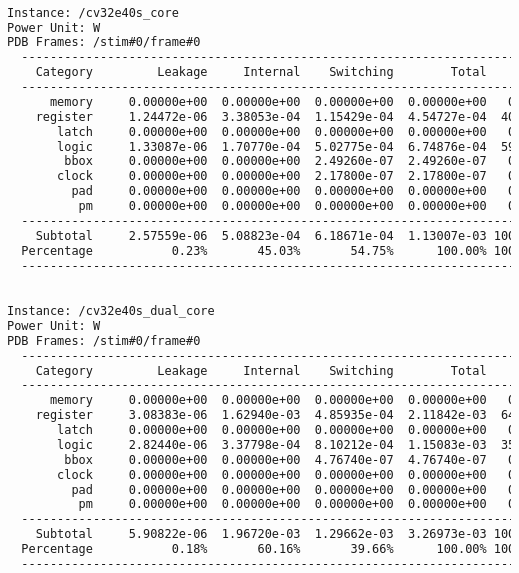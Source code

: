 \begin{lstlisting}[caption={Power usage report from synthesis of the CV32E40S.}, label=lst:cv32e40s_power, language=txt]

Instance: /cv32e40s_core
Power Unit: W
PDB Frames: /stim#0/frame#0
  -------------------------------------------------------------------------
    Category         Leakage     Internal    Switching        Total    Row%
  -------------------------------------------------------------------------
      memory     0.00000e+00  0.00000e+00  0.00000e+00  0.00000e+00   0.00%
    register     1.24472e-06  3.38053e-04  1.15429e-04  4.54727e-04  40.24%
       latch     0.00000e+00  0.00000e+00  0.00000e+00  0.00000e+00   0.00%
       logic     1.33087e-06  1.70770e-04  5.02775e-04  6.74876e-04  59.72%
        bbox     0.00000e+00  0.00000e+00  2.49260e-07  2.49260e-07   0.02%
       clock     0.00000e+00  0.00000e+00  2.17800e-07  2.17800e-07   0.02%
         pad     0.00000e+00  0.00000e+00  0.00000e+00  0.00000e+00   0.00%
          pm     0.00000e+00  0.00000e+00  0.00000e+00  0.00000e+00   0.00%
  -------------------------------------------------------------------------
    Subtotal     2.57559e-06  5.08823e-04  6.18671e-04  1.13007e-03 100.00%
  Percentage           0.23%       45.03%       54.75%      100.00% 100.00%
  -------------------------------------------------------------------------
\end{lstlisting}

\begin{lstlisting}[caption={Power usage report from synthesis of the CV32E40SDC.}, label=lst:cv32e40dc_power, language=txt]

Instance: /cv32e40s_dual_core
Power Unit: W
PDB Frames: /stim#0/frame#0
  -------------------------------------------------------------------------
    Category         Leakage     Internal    Switching        Total    Row%
  -------------------------------------------------------------------------
      memory     0.00000e+00  0.00000e+00  0.00000e+00  0.00000e+00   0.00%
    register     3.08383e-06  1.62940e-03  4.85935e-04  2.11842e-03  64.79%
       latch     0.00000e+00  0.00000e+00  0.00000e+00  0.00000e+00   0.00%
       logic     2.82440e-06  3.37798e-04  8.10212e-04  1.15083e-03  35.20%
        bbox     0.00000e+00  0.00000e+00  4.76740e-07  4.76740e-07   0.01%
       clock     0.00000e+00  0.00000e+00  0.00000e+00  0.00000e+00   0.00%
         pad     0.00000e+00  0.00000e+00  0.00000e+00  0.00000e+00   0.00%
          pm     0.00000e+00  0.00000e+00  0.00000e+00  0.00000e+00   0.00%
  -------------------------------------------------------------------------
    Subtotal     5.90822e-06  1.96720e-03  1.29662e-03  3.26973e-03 100.00%
  Percentage           0.18%       60.16%       39.66%      100.00% 100.00%
  -------------------------------------------------------------------------
\end{lstlisting}

